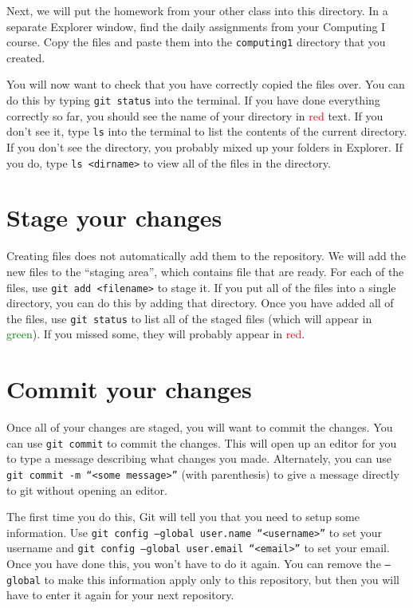 \documentclass[12pt]{article}
\newcommand{\code}[1]{\texttt{#1}}
\begin{document}
Next, we will put the homework from your other class into this directory.
In a separate Explorer window, find the daily assignments from your Computing I course.
Copy the files and paste them into the \texttt{computing1} directory that you created.

You will now want to check that you have correctly copied the files over.
You can do this by typing \texttt{git status} into the terminal.
If you have done everything correctly so far, you should see the name of your directory in \textcolor{red}{red} text.
If you don't see it, type \texttt{ls} into the terminal to list the contents of the current directory.
If you don't see the directory, you probably mixed up your folders in Explorer.
If you do, type \texttt{ls <dirname>} to view all of the files in the directory.

\section{Stage your changes}

Creating files does not automatically add them to the repository.
We will add the new files to the ``staging area'', which contains file that are ready.
For each of the files, use \code{git add <filename>} to stage it.
If you put all of the files into a single directory, you can do this by adding that directory.
Once you have added all of the files, use \code{git status} to list all of the staged files (which will appear in \textcolor{green}{green}).
If you missed some, they will probably appear in \textcolor{red}{red}.

\section{Commit your changes}

Once all of your changes are staged, you will want to commit the changes.
You can use \code{git commit} to commit the changes.
This will open up an editor for you to type a message describing what changes you made.
Alternately, you can use \code{git commit -m ``<some message>''} (with parenthesis) to give a message directly to git without opening an editor.

The first time you do this, Git will tell you that you need to setup some information.
Use \code{git config --global user.name ``<username>''} to set your username and \code{git config --global user.email ``<email>''} to set your email.
Once you have done this, you won't have to do it again.
You can remove the \code{--global} to make this information apply only to this repository, but then you will have to enter it again for your next repository.
\end{document}
